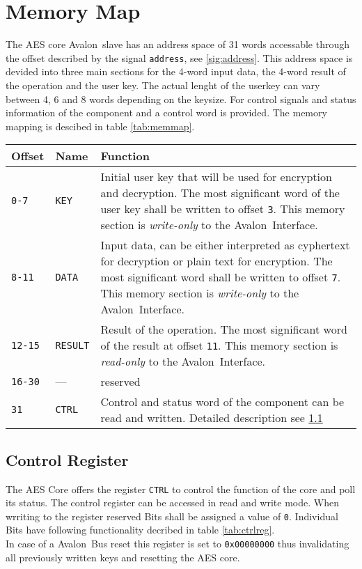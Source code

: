 \documentclass{ruschidoc}
\begin{document}
\section{Memory Map}
\label{sec:memmap}
The AES core Avalon\rtm\ slave has an address space of 31 words accessable through the
offset described by the signal \texttt{address}, see \ref{sig:address}. This address
space is devided into three main sections for the 4-word input data, the 4-word
result of the operation and the user key. The actual lenght of the userkey can vary
between 4, 6 and 8 words depending on the keysize. For control signals and status
information of the component and a control word is provided. The memory mapping is
descibed in table \ref{tab:memmap}.

\begin{tabularx}{\textwidth}{|p{13mm}|p{18mm}|X|}
  \hline
  \bf{Offset} & \bf{Name} & \bf{Function}\\ \hline
  \texttt{0-7} & \texttt{KEY}  & Initial user key that will be used for encryption and decryption. 
	The most significant word of the user key shall be written to offset \texttt{3}. This memory section is \emph{write-only} to the Avalon\rtm\ Interface.\\ \hline 	 
  \texttt{8-11} & \texttt{DATA} &Input data, can be either interpreted as cyphertext for decryption or plain text for encryption. 
	The most significant word shall be written to offset \texttt{7}. This memory section is \emph{write-only} to the Avalon\rtm\ Interface. \\ \hline
  \texttt{12-15} & \texttt{RESULT} &Result of the operation. The most significant word of the result at offset \texttt{11}.  
	This memory section is \emph{read-only} to the Avalon\rtm\ Interface.  \\ \hline	 
   \texttt{16-30} & --- &  reserved  \\ \hline	 
 \texttt{31} & \texttt{CTRL} & Control and status word of the component can be read and written. Detailed description see \ref{sec:ctrl}\\ \hline	
\end{tabularx}
\label{tab:memmap}

\subsection{Control Register}
\label{sec:ctrl}
The AES Core offers the register \texttt{CTRL} to control the function of the core
and poll its status. The control register can be accessed in read and write mode.
 When wrriting to the register reserved Bits shall be assigned a value of \texttt{0}.
 Individual Bits have following functionality decribed in table \ref{tab:ctrlreg}. \\
In case of a Avalon\rtm\ Bus reset this register is set to \texttt{0x00000000} thus
invalidating all previously written keys and resetting the AES core.
\end{document}
